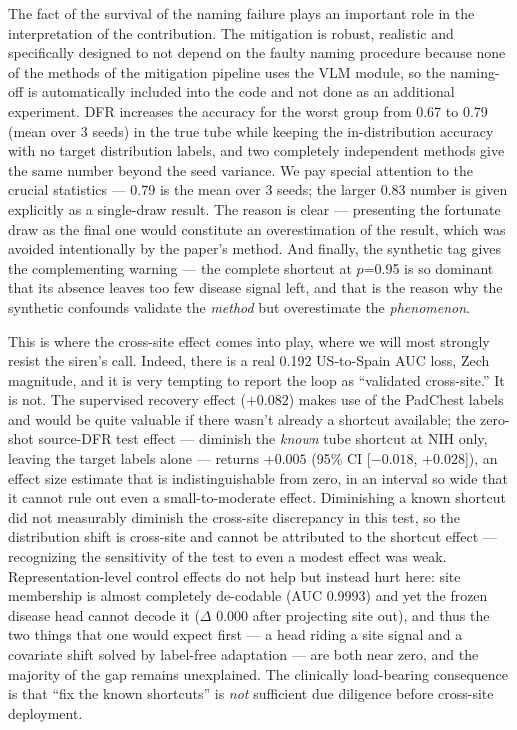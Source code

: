\documentclass{ieeeaccess}
\begin{document}
The fact of the survival of the naming failure plays an important role in the interpretation of the contribution. The mitigation is robust, realistic and specifically designed to not depend on the faulty naming procedure because none of the methods of the mitigation pipeline uses the VLM module, so the naming-off is automatically included into the code and not done as an additional experiment. DFR increases the accuracy for the worst group from 0.67 to 0.79 (mean over 3 seeds) in the true tube while keeping the in-distribution accuracy with no target distribution labels, and two completely independent methods give the same number beyond the seed variance. We pay special attention to the crucial statistics --- 0.79 is the mean over 3 seeds; the larger 0.83 number is given explicitly as a single-draw result. The reason is clear --- presenting the fortunate draw as the final one would constitute an overestimation of the result, which was avoided intentionally by the paper's method. And finally, the synthetic tag gives the complementing warning --- the complete shortcut at $p$=0.95 is so dominant that its absence leaves too few disease signal left, and that is the reason why the synthetic confounds validate the \emph{method} but overestimate the \emph{phenomenon}.

This is where the cross-site effect comes into play, where we will most strongly resist the siren's call. Indeed, there is a real 0.192 US-to-Spain AUC loss, Zech magnitude, and it is very tempting to report the loop as ``validated cross-site.'' It is not. The supervised recovery effect ($+0.082$) makes use of the PadChest labels and would be quite valuable if there wasn't already a shortcut available; the zero-shot source-DFR test effect --- diminish the \emph{known} tube shortcut at NIH only, leaving the target labels alone --- returns $+0.005$ (95\% CI [$-0.018$, $+0.028$]), an effect size estimate that is indistinguishable from zero, in an interval so wide that it cannot rule out even a small-to-moderate effect. Diminishing a known shortcut did not measurably diminish the cross-site discrepancy in this test, so the distribution shift is cross-site and cannot be attributed to the shortcut effect --- recognizing the sensitivity of the test to even a modest effect was weak. Representation-level control effects do not help but instead hurt here: site membership is almost completely de-codable (AUC 0.9993) and yet the frozen disease head cannot decode it ($\Delta$ 0.000 after projecting site out), and thus the two things that one would expect first --- a head riding a site signal and a covariate shift solved by label-free adaptation --- are both near zero, and the majority of the gap remains unexplained. The clinically load-bearing consequence is that ``fix the known shortcuts'' is \emph{not} sufficient due diligence before cross-site deployment.
\end{document}
